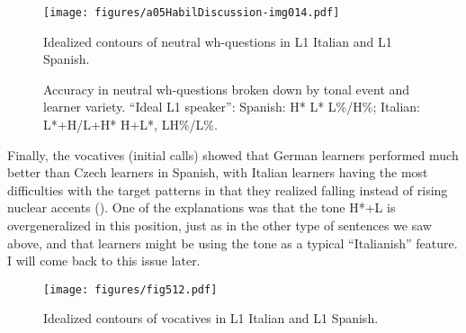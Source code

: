 \begin{figure}

\texttt{[image: figures/a05HabilDiscussion-img014.pdf]}



\caption{Idealized contours of neutral wh-questions in L1 Italian and L1 Spanish.}
\label{fig:5.10}
\end{figure}

\begin{figure}




\caption{Accuracy in neutral wh-questions broken down by tonal event and learner variety. ``Ideal L1 speaker'': Spanish: H* L* L\%/H\%; Italian: L*+H/L+H* H+L*, LH\%/L\%.}
\label{fig:5.11}
\end{figure}


Finally, the vocatives (initial calls) showed that German learners performed much better than Czech learners in Spanish, with Italian learners having the most difficulties with the target patterns in that they realized falling instead of rising nuclear accents (). One of the explanations was that the tone H*+L is overgeneralized in this position, just as in the other type of sentences we saw above, and that learners might be using the tone as a typical “Italianish” feature. I will come back to this issue later.


\begin{figure}

\texttt{[image: figures/fig512.pdf]}
\caption{Idealized contours of vocatives in L1 Italian and L1 Spanish.}
\label{fig:5.12}
\end{figure}


